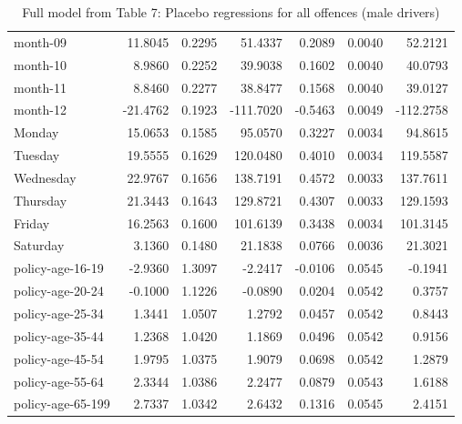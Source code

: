 \documentclass[10pt]{article}
\begin{document}
\begin{table}[ht]
\begin{tabular}{lrrrrrr}
  month-09 & 11.8045 & 0.2295 & 51.4337 & 0.2089 & 0.0040 & 52.2121 \\ 
  month-10 & 8.9860 & 0.2252 & 39.9038 & 0.1602 & 0.0040 & 40.0793 \\ 
  month-11 & 8.8460 & 0.2277 & 38.8477 & 0.1568 & 0.0040 & 39.0127 \\ 
  month-12 & -21.4762 & 0.1923 & -111.7020 & -0.5463 & 0.0049 & -112.2758 \\ 
  Monday & 15.0653 & 0.1585 & 95.0570 & 0.3227 & 0.0034 & 94.8615 \\ 
  Tuesday & 19.5555 & 0.1629 & 120.0480 & 0.4010 & 0.0034 & 119.5587 \\ 
  Wednesday & 22.9767 & 0.1656 & 138.7191 & 0.4572 & 0.0033 & 137.7611 \\ 
  Thursday & 21.3443 & 0.1643 & 129.8721 & 0.4307 & 0.0033 & 129.1593 \\ 
  Friday & 16.2563 & 0.1600 & 101.6139 & 0.3438 & 0.0034 & 101.3145 \\ 
  Saturday & 3.1360 & 0.1480 & 21.1838 & 0.0766 & 0.0036 & 21.3021 \\ 
  policy-age-16-19 & -2.9360 & 1.3097 & -2.2417 & -0.0106 & 0.0545 & -0.1941 \\ 
  policy-age-20-24 & -0.1000 & 1.1226 & -0.0890 & 0.0204 & 0.0542 & 0.3757 \\ 
  policy-age-25-34 & 1.3441 & 1.0507 & 1.2792 & 0.0457 & 0.0542 & 0.8443 \\ 
  policy-age-35-44 & 1.2368 & 1.0420 & 1.1869 & 0.0496 & 0.0542 & 0.9156 \\ 
  policy-age-45-54 & 1.9795 & 1.0375 & 1.9079 & 0.0698 & 0.0542 & 1.2879 \\ 
  policy-age-55-64 & 2.3344 & 1.0386 & 2.2477 & 0.0879 & 0.0543 & 1.6188 \\ 
  policy-age-65-199 & 2.7337 & 1.0342 & 2.6432 & 0.1316 & 0.0545 & 2.4151 \\ 
   \hline
\end{tabular}
\caption{Full model from Table 7: Placebo regressions for all offences (male drivers)} 
\label{tab_7_all_pts_M}
\end{table}


\clearpage
\pagebreak



\end{document}
